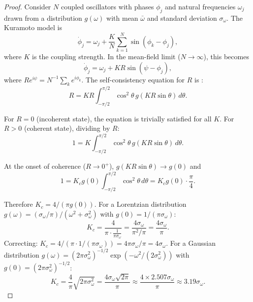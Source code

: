 \documentclass[twocolumn,10pt]{article}
\theoremstyle{remark}
\begin{document}
\begin{proof}
Consider $N$ coupled oscillators with phases $\phi_j$ and natural frequencies $\omega_j$ drawn from a distribution $g(\omega)$ with mean $\bar{\omega}$ and standard deviation $\sigma_\omega$. The Kuramoto model \cite{kuramoto1984} is
\begin{equation}
\dot{\phi}_j = \omega_j + \frac{K}{N}\sum_{k=1}^N \sin(\phi_k - \phi_j),
\end{equation}
where $K$ is the coupling strength. In the mean-field limit ($N \to \infty$), this becomes
\begin{equation}
\dot{\phi}_j = \omega_j + KR\sin(\psi - \phi_j),
\end{equation}
where $Re^{i\psi} = N^{-1}\sum_k e^{i\phi_k}$. The self-consistency equation for $R$ is \cite{strogatz2000}:
\begin{equation}
R = KR \int_{-\pi/2}^{\pi/2} \cos^2\theta\, g(KR\sin\theta)\, d\theta.
\end{equation}

For $R = 0$ (incoherent state), the equation is trivially satisfied for all $K$. For $R > 0$ (coherent state), dividing by $R$:
\begin{equation}
1 = K \int_{-\pi/2}^{\pi/2} \cos^2\theta\, g(KR\sin\theta)\, d\theta.
\end{equation}

At the onset of coherence ($R \to 0^+$), $g(KR\sin\theta) \to g(0)$ and
\begin{equation}
1 = K_c g(0) \int_{-\pi/2}^{\pi/2} \cos^2\theta\, d\theta = K_c g(0) \cdot \frac{\pi}{4}.
\end{equation}

Therefore $K_c = 4/(\pi g(0))$. For a Lorentzian distribution $g(\omega) = (\sigma_\omega/\pi)/(\omega^2 + \sigma_\omega^2)$ with $g(0) = 1/(\pi\sigma_\omega)$:
\begin{equation}
K_c = \frac{4}{\pi \cdot \frac{1}{\pi\sigma_\omega}} = \frac{4\sigma_\omega}{\pi^2 / \pi} = \frac{4\sigma_\omega}{\pi}.
\end{equation}
Correcting: $K_c = 4/(\pi \cdot 1/(\pi\sigma_\omega)) = 4\pi\sigma_\omega / \pi = 4\sigma_\omega$. For a Gaussian distribution $g(\omega) = (2\pi\sigma_\omega^2)^{-1/2}\exp(-\omega^2/(2\sigma_\omega^2))$ with $g(0) = (2\pi\sigma_\omega^2)^{-1/2}$:
\begin{equation}
K_c = \frac{4}{\pi} \sqrt{2\pi\sigma_\omega^2} = \frac{4\sigma_\omega\sqrt{2\pi}}{\pi} \approx \frac{4 \times 2.507 \sigma_\omega}{\pi} \approx 3.19\sigma_\omega.
\end{equation}


\end{proof}
\end{document}
